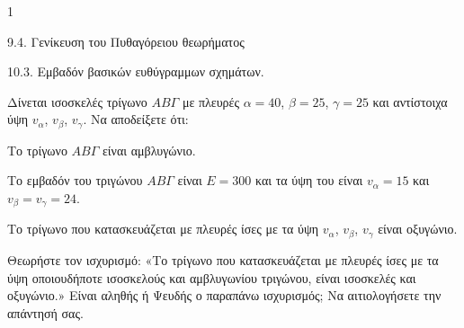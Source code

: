 \begin{ylh}{1}
    \item 9.4. Γενίκευση του Πυθαγόρειου θεωρήματος
    \item 10.3. Εμβαδόν βασικών ευθύγραμμων σχημάτων.
\end{ylh}
\begin{alist}
\item Δίνεται ισοσκελές τρίγωνο $AB\Gamma$ με πλευρές $\alpha = 40$, $\beta = 25$, $\gamma = 25$ και αντίστοιχα ύψη $v_{\alpha}$, $v_{\beta}$, $v_{\gamma}$. Να αποδείξετε ότι:
    \begin{rlist}
    \item Το τρίγωνο $AB\Gamma$ είναι αμβλυγώνιο. 
    \item Το εμβαδόν του τριγώνου $AB\Gamma$ είναι $E = 300$ και τα ύψη του είναι $v_{\alpha} = 15$ και $v_{\beta} = v_{\gamma} = 24$. 
    \item Το τρίγωνο που κατασκευάζεται με πλευρές ίσες με τα ύψη $v_{\alpha}$, $v_{\beta}$, $v_{\gamma}$ είναι οξυγώνιο. 
    \end{rlist}
\item Θεωρήστε τον ισχυρισμό: «Το τρίγωνο που κατασκευάζεται με πλευρές ίσες με τα ύψη οποιουδήποτε ισοσκελούς και αμβλυγωνίου τριγώνου, είναι ισοσκελές και οξυγώνιο.» Είναι αληθής ή Ψευδής ο παραπάνω ισχυρισμός; Να αιτιολογήσετε την απάντησή σας. 
\end{alist}